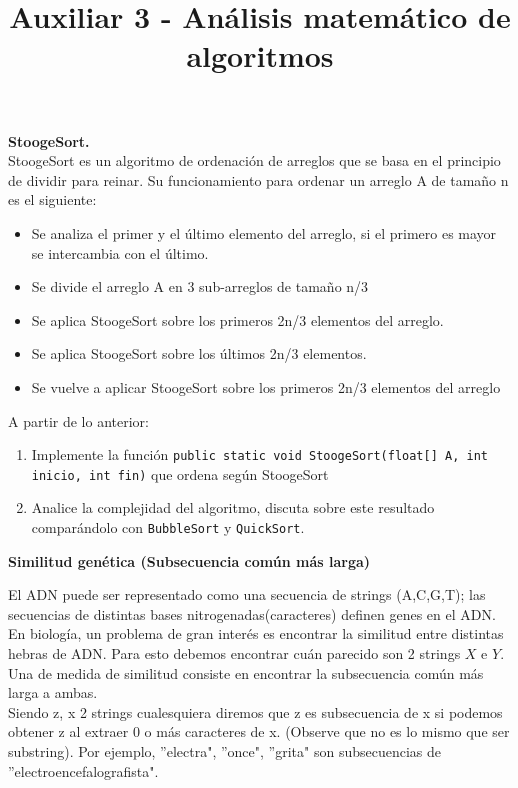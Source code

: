 \documentclass[dcc]{fcfmcourse}
\title{Auxiliar 3 - Análisis matemático de algoritmos}
\begin{document}
\maketitle

\vspace{-1ex}

\begin{problems}
\problem \textbf{StoogeSort.}\\
StoogeSort es un algoritmo de ordenación de arreglos que se basa en el principio de dividir para reinar. Su funcionamiento para ordenar un arreglo A de tamaño n es el siguiente: 

\begin{itemize}
    \item Se analiza el primer y el último elemento del arreglo, si el primero es mayor se intercambia con el último.
    \item Se divide el arreglo A en 3 sub-arreglos de tamaño n/3
    \item Se aplica StoogeSort sobre los primeros 2n/3 elementos del arreglo.
    \item Se aplica StoogeSort sobre los últimos 2n/3 elementos.
    \item Se vuelve a aplicar StoogeSort sobre los primeros 2n/3 elementos del arreglo
\end{itemize}

A partir de lo anterior:

\begin{enumerate}
    \item Implemente la función \texttt{public static void StoogeSort(float[] A, int inicio, int fin)} que ordena según StoogeSort
    \item Analice la complejidad del algoritmo, discuta sobre este resultado comparándolo con \texttt{BubbleSort} y \texttt{QuickSort}.
\end{enumerate}

\problem \textbf{Similitud genética (Subsecuencia común más larga)}

El ADN puede ser representado como una secuencia de strings (A,C,G,T); las secuencias de distintas bases nitrogenadas(caracteres) definen genes en el ADN. En biología, un problema de gran interés es encontrar la similitud entre distintas hebras de ADN. Para esto debemos encontrar cuán parecido son 2 strings $X$ e $Y$. Una de medida de similitud consiste en encontrar la subsecuencia común más larga a ambas. \\

Siendo z, x 2 strings cualesquiera diremos que z es subsecuencia de x si podemos obtener z al extraer 0 o más caracteres de x. (Observe que no es lo mismo que ser substring). Por ejemplo, ''electra", ''once", ''grita" son subsecuencias de ''electroencefalografista".\\


\end{problems}
\end{document}
